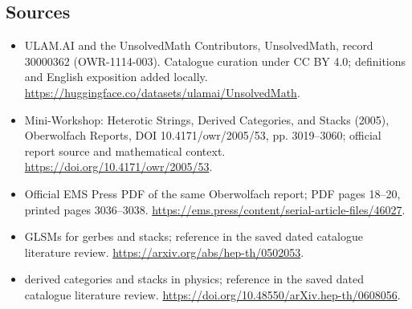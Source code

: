 \documentclass[11pt]{article}
\begin{document}
\subsection{Sources}
\begin{itemize}
\item[\hypertarget{source:30000362:1}{S1}] ULAM.AI and the UnsolvedMath Contributors, UnsolvedMath, record 30000362 (OWR-1114-003). Catalogue curation under CC BY 4.0; definitions and English exposition added locally.
\url{https://huggingface.co/datasets/ulamai/UnsolvedMath}.
\item[\hypertarget{source:30000362:2}{S2}] Mini-Workshop: Heterotic Strings, Derived Categories, and Stacks (2005), Oberwolfach Reports, DOI 10.4171/owr/2005/53, pp. 3019--3060; official report source and mathematical context.
\url{https://doi.org/10.4171/owr/2005/53}.
\item[\hypertarget{source:30000362:3}{S3}] Official EMS Press PDF of the same Oberwolfach report; PDF pages 18--20, printed pages 3036--3038.
\url{https://ems.press/content/serial-article-files/46027}.
\item[\hypertarget{source:30000362:4}{S4}] GLSMs for gerbes and stacks; reference in the saved dated catalogue literature review.
\url{https://arxiv.org/abs/hep-th/0502053}.
\item[\hypertarget{source:30000362:5}{S5}] derived categories and stacks in physics; reference in the saved dated catalogue literature review.
\url{https://doi.org/10.48550/arXiv.hep-th/0608056}.
\end{itemize}
\label{end:30000362}
\end{document}

